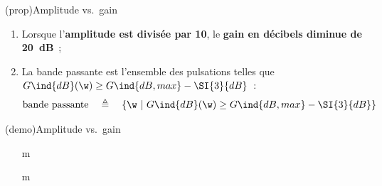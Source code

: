 \documentclass[../../main/main.tex]{subfiles}
\begin{document}
\begin{tcb*}(prop){Amplitude vs.\ gain}
	\begin{enumerate}
		\item Lorsque l'\textbf{amplitude est divisée par 10}, le \textbf{gain en
			      décibels diminue de \SI{20}{dB}}~;
		\item La bande passante est l'ensemble des pulsations telles que
		      $G\ind{dB}(\w) \geq G\ind{dB,max} - \SI{3}{dB}$~:
		      \[
			      \text{bande passante}
			      \quad \triangleq \quad
			      \{\w ~|~ G\ind{dB}(\w) \geq G\ind{dB, max}-\SI{3}{dB}\}
		      \]
	\end{enumerate}
\end{tcb*}
\begin{tcb*}(demo){Amplitude vs.\ gain}
	\begin{enumerate}
		\item[m]
		      \vspace{-15pt}
	\end{enumerate}
	\tcblower
	\begin{enumerate}[start=2]
		\item[m]
	\end{enumerate}
\end{tcb*}
\end{document}
